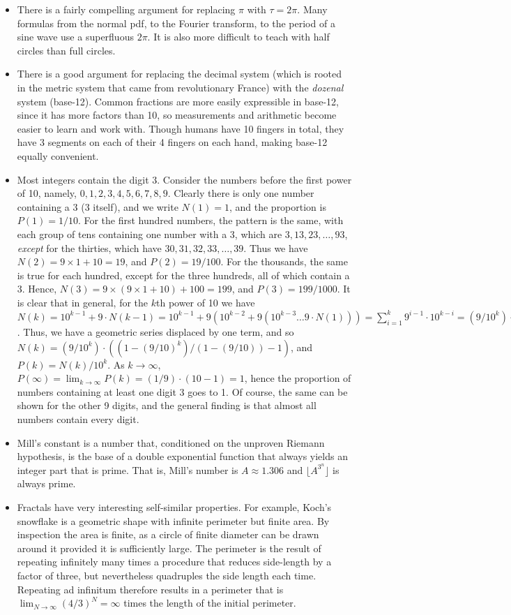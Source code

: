 \documentclass[11pt]{amsart}
\begin{document}
\begin{itemize}
\item There is a fairly compelling argument for replacing $\pi$ with $\tau = 2\pi$. Many formulas from the normal pdf, to the Fourier transform, to the period of a sine wave use a superfluous $2\pi$. It is also more difficult to teach with half circles than full circles.
\item There is a good argument for replacing the decimal system (which is rooted in the metric system that came from revolutionary France) with the \emph{dozenal} system (base-12). Common fractions are more easily expressible in base-12, since it has more factors than 10, so measurements and arithmetic become easier to learn and work with. Though humans have 10 fingers in total, they have 3 segments on each of their 4 fingers on each hand, making base-12 equally convenient.
\item Most integers contain the digit 3. Consider the numbers before the first power of 10, namely, $0, 1, 2, 3, 4, 5, 6, 7, 8, 9$. Clearly there is only one number containing a 3 (3 itself), and we write $N(1) = 1$, and the proportion is $P(1) = 1/10$. For the first hundred numbers, the pattern is the same, with each group of tens containing one number with a 3, which are $3, 13, 23, \dots, 93$, \emph{except} for the thirties, which have $30, 31, 32, 33, \dots, 39$. Thus we have $N(2) = 9 \times 1 + 10 = 19$, and $P(2) = 19/100$. For the thousands, the same is true for each hundred, except for the three hundreds, all of which contain a 3. Hence, $N(3) = 9\times(9 \times 1 + 10) + 100 = 199$, and $P(3) = 199/1000$. It is clear that in general, for the $k$th power of 10 we have $N(k) = 10^{k-1} + 9\cdot N(k-1) = 10^{k-1} + 9(10^{k-2} + 9(10^{k-3} \dots 9\cdot N(1))) = \sum_{i=1}^{k}9^{i-1}\cdot10^{k-i} = (9/10^k)\cdot\sum_{i=1}^{k}(9/10)^i$. Thus, we have a geometric series displaced by one term, and so $N(k) =  (9/10^k)\cdot((1-(9/10)^k)/(1-(9/10)) - 1)$, and $P(k) = N(k)/10^k$. As $k \to \infty$, $P(\infty) = \lim_{k \to \infty} P(k) = (1/9)\cdot(10 - 1) = 1$, hence the proportion of numbers containing at least one digit 3 goes to 1. Of course, the same can be shown for the other 9 digits, and the general finding is that almost all numbers contain every digit.
\item Mill's constant is a number that, conditioned on the unproven Riemann hypothesis, is the base of a double exponential function that always yields an integer part that is prime. That is, Mill's number is $A \approx 1.306$ and $\lfloor A^{3^n}\rfloor$ is always prime.
\item Fractals have very interesting self-similar properties. For example, Koch's snowflake is a geometric shape with infinite perimeter but finite area. By inspection the area is finite, as a circle of finite diameter can be drawn around it provided it is sufficiently large. The perimeter is the result of repeating infinitely many times a procedure that reduces side-length by a factor of three, but nevertheless quadruples the side length each time. Repeating ad infinitum therefore results in a perimeter that is $\lim_{N \to \infty}(4/3)^N = \infty$ times the length of the initial perimeter.

\end{itemize}
\end{document}
